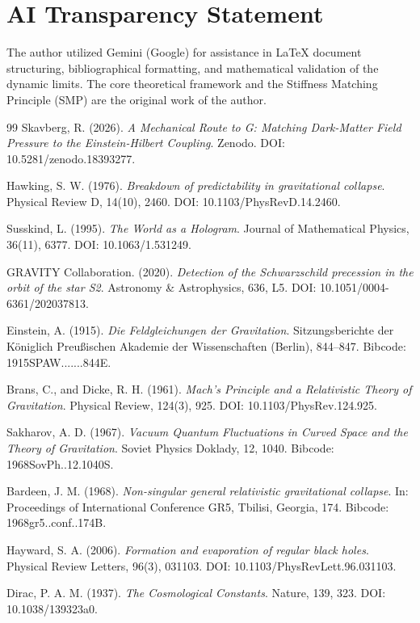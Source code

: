 \documentclass[11pt,letterpaper]{article}
\begin{document}
\section*{AI Transparency Statement}
The author utilized Gemini (Google) for assistance in LaTeX document structuring, bibliographical formatting, and mathematical validation of the dynamic limits. The core theoretical framework and the Stiffness Matching Principle (SMP) are the original work of the author.

\begin{thebibliography}{99}
Skavberg, R. (2026). \textit{A Mechanical Route to G: Matching Dark-Matter Field Pressure to the Einstein-Hilbert Coupling}. Zenodo. DOI: 10.5281/zenodo.18393277.

Hawking, S. W. (1976). \textit{Breakdown of predictability in gravitational collapse}. Physical Review D, 14(10), 2460. DOI: 10.1103/PhysRevD.14.2460.

Susskind, L. (1995). \textit{The World as a Hologram}. Journal of Mathematical Physics, 36(11), 6377. DOI: 10.1063/1.531249.

GRAVITY Collaboration. (2020). \textit{Detection of the Schwarzschild precession in the orbit of the star S2}. Astronomy \& Astrophysics, 636, L5. DOI: 10.1051/0004-6361/202037813.

Einstein, A. (1915). \textit{Die Feldgleichungen der Gravitation}. Sitzungsberichte der Königlich Preußischen Akademie der Wissenschaften (Berlin), 844--847. Bibcode: 1915SPAW.......844E.

Brans, C., and Dicke, R. H. (1961). \textit{Mach's Principle and a Relativistic Theory of Gravitation}. Physical Review, 124(3), 925. DOI: 10.1103/PhysRev.124.925.

Sakharov, A. D. (1967). \textit{Vacuum Quantum Fluctuations in Curved Space and the Theory of Gravitation}. Soviet Physics Doklady, 12, 1040. Bibcode: 1968SovPh..12.1040S.

Bardeen, J. M. (1968). \textit{Non-singular general relativistic gravitational collapse}. In: Proceedings of International Conference GR5, Tbilisi, Georgia, 174. Bibcode: 1968gr5..conf..174B.

Hayward, S. A. (2006). \textit{Formation and evaporation of regular black holes}. Physical Review Letters, 96(3), 031103. DOI: 10.1103/PhysRevLett.96.031103.

Dirac, P. A. M. (1937). \textit{The Cosmological Constants}. Nature, 139, 323. DOI: 10.1038/139323a0.
\end{thebibliography}
\end{document}
